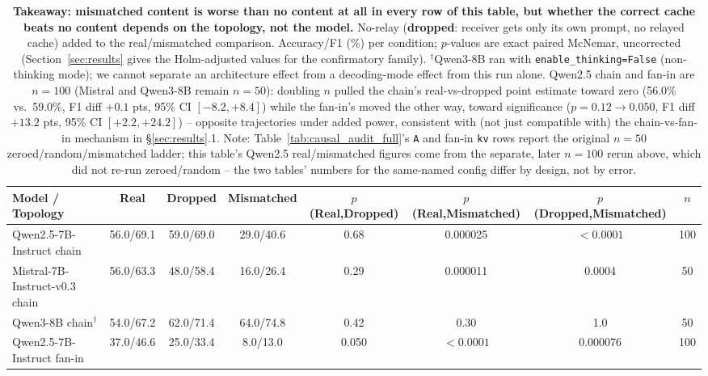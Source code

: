 
\begin{table}[t]
\centering
\small
\begin{tabular}{lccccccc}
\toprule
\textbf{Model / Topology} & \textbf{Real} & \textbf{Dropped} & \textbf{Mismatched} & \textbf{$p$(Real,Dropped)} & \textbf{$p$(Real,Mismatched)} & \textbf{$p$(Dropped,Mismatched)} & \textbf{$n$} \\
\midrule
Qwen2.5-7B-Instruct chain          & 56.0/69.1 & 59.0/69.0 & 29.0/40.6 & 0.68   & 0.000025 & $<0.0001$ & 100 \\
Mistral-7B-Instruct-v0.3 chain     & 56.0/63.3 & 48.0/58.4 & 16.0/26.4 & 0.29   & 0.000011 & 0.0004   & 50 \\
Qwen3-8B chain$^\dagger$           & 54.0/67.2 & 62.0/71.4 & 64.0/74.8 & 0.42   & 0.30     & 1.0      & 50 \\
Qwen2.5-7B-Instruct fan-in         & 37.0/46.6 & 25.0/33.4 & 8.0/13.0 & 0.050  & $<0.0001$ & 0.000076 & 100 \\
\bottomrule
\end{tabular}
\caption{\textbf{Takeaway: mismatched content is worse than no content
at all in every row of this table, but whether the correct cache beats
no content depends on the topology, not the model.} No-relay
(\textbf{dropped}: receiver gets only its own prompt, no relayed cache)
added to the real/mismatched comparison. Accuracy/F1 (\%) per
condition; $p$-values are exact paired McNemar, uncorrected (Section~\ref{sec:results}
gives the Holm-adjusted values for the confirmatory family). $^\dagger$Qwen3-8B
ran with \texttt{enable\_thinking=False} (non-thinking mode); we cannot
separate an architecture effect from a decoding-mode effect from this run
alone. Qwen2.5 chain and fan-in are $n=100$ (Mistral and Qwen3-8B remain
$n=50$): doubling $n$ pulled the chain's real-vs-dropped point estimate
toward zero (56.0\% vs.\ 59.0\%, F1 diff $+0.1$ pts, 95\% CI $[-8.2,
+8.4]$) while the fan-in's moved the other way, toward significance
($p=0.12\to0.050$, F1 diff $+13.2$ pts, 95\% CI $[+2.2, +24.2]$) --
opposite trajectories under added power, consistent with (not just
compatible with) the chain-vs-fan-in mechanism in \S\ref{sec:results}.1.
Note: Table~\ref{tab:causal_audit_full}'s \texttt{A} and fan-in
\texttt{kv} rows report the original $n=50$ zeroed/random/mismatched
ladder; this table's Qwen2.5 real/mismatched figures come from the
separate, later $n=100$ rerun above, which did not re-run
zeroed/random -- the two tables' numbers for the same-named config
differ by design, not by error.}
\label{tab:no_relay}
\end{table}
